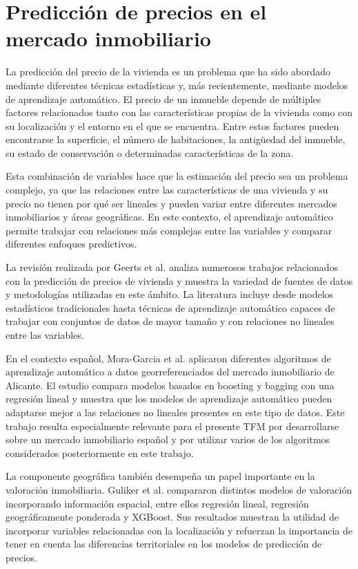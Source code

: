 \documentclass[IB]{TFUOC}%
\begin{document}
\section{Predicción de precios en el mercado inmobiliario}

La predicción del precio de la vivienda es un problema que ha sido abordado mediante diferentes técnicas estadísticas y, más recientemente, mediante modelos de aprendizaje automático. El precio de un inmueble depende de múltiples factores relacionados tanto con las características propias de la vivienda como con su localización y el entorno en el que se encuentra. Entre estos factores pueden encontrarse la superficie, el número de habitaciones, la antigüedad del inmueble, su estado de conservación o determinadas características de la zona.

Esta combinación de variables hace que la estimación del precio sea un problema complejo, ya que las relaciones entre las características de una vivienda y su precio no tienen por qué ser lineales y pueden variar entre diferentes mercados inmobiliarios y áreas geográficas. En este contexto, el aprendizaje automático permite trabajar con relaciones más complejas entre las variables y comparar diferentes enfoques predictivos.

La revisión realizada por Geerts et al. \cite{houseprice_survey2023} analiza numerosos trabajos relacionados con la predicción de precios de vivienda y muestra la variedad de fuentes de datos y metodologías utilizadas en este ámbito. La literatura incluye desde modelos estadísticos tradicionales hasta técnicas de aprendizaje automático capaces de trabajar con conjuntos de datos de mayor tamaño y con relaciones no lineales entre las variables.

En el contexto español, Mora-Garcia et al. \cite{moragarcia2022housing} aplicaron diferentes algoritmos de aprendizaje automático a datos georreferenciados del mercado inmobiliario de Alicante. El estudio compara modelos basados en boosting y bagging con una regresión lineal y muestra que los modelos de aprendizaje automático pueden adaptarse mejor a las relaciones no lineales presentes en este tipo de datos. Este trabajo resulta especialmente relevante para el presente TFM por desarrollarse sobre un mercado inmobiliario español y por utilizar varios de los algoritmos considerados posteriormente en este trabajo.

La componente geográfica también desempeña un papel importante en la valoración inmobiliaria. Guliker et al. \cite{guliker2022spatial} compararon distintos modelos de valoración incorporando información espacial, entre ellos regresión lineal, regresión geográficamente ponderada y XGBoost. Sus resultados muestran la utilidad de incorporar variables relacionadas con la localización y refuerzan la importancia de tener en cuenta las diferencias territoriales en los modelos de predicción de precios.
\end{document}
